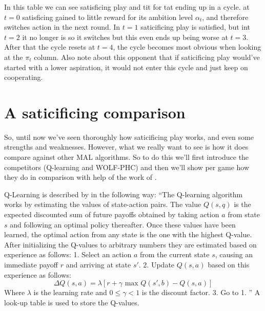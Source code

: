 In this table we can see satisficing play and tit for tat ending up in a cycle.
at $t=0$ satisficing gained to little reward for its ambition level $\alpha_t$,
and therefore switches action in the next round. In $t=1$ saticificing play
is satisfied, but int $t=2$ it no longer is so it switches but this even ends
up being worse at $t=3$. After that the cycle resets at $t=4$, the cycle becomes
most obvious when looking at the $\pi_t$ column. Also note about this opponent
that if saticificing play would've started with a lower aspiration, it would
not enter this cycle and just keep on cooperating.

\section{A saticificing comparison}
\drafting So, until now we've seen thoroughly how saticificing play works, and even some
strengths and weaknesses. However, what we really want to see is how it does
compare against other MAL algorithms. So to do this we'll first introduce the
competitors (Q-learning and WOLF-PHC) and then we'll show per game how they
do in comparison with help of the work of \citep{crandall}.

Q-Learning is described by \citep{sandholm} in the following way: ``The
Q-learning algorithm works by estimating the values of state-action pairs. The
value $Q(s,q)$ is the expected discounted sum of future payoffs obtained by taking
action $a$ from state $s$ and following an optimal policy thereafter.
Once these values have been learned, the optimal action from any state
is the one with the highest Q-value. After initializing the Q-values to arbitrary
numbers they are estimated based on experience as follows: 1. Select an action
$a$ from the current state $s$, causing an immediate payoff $r$ and arriving at
state $s'$. 2. Update $Q(s,a)$ based on this experience as follows:
\[\Delta Q(s,a) = \lambda[r+\gamma \text{ max }Q(s',b)-Q(s,a)]\]
Where $\lambda$ is the learning rate and $0 \leq \gamma < 1$ is the discount
factor.
3. Go to 1.
'' A look-up table is used to store the Q-values.

